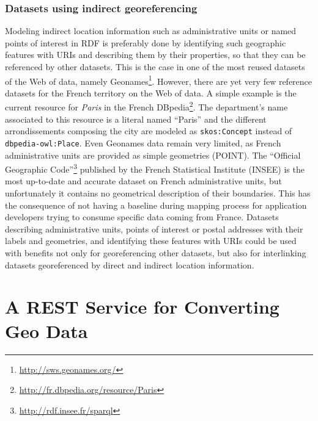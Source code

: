 \subsubsection{Datasets using indirect georeferencing}
Modeling indirect location information such as administrative units or named points of interest in RDF is preferably done by identifying such geographic features with URIs and describing them by their properties, so that they can be referenced by other datasets. This is the case in one of the most reused datasets of the Web of data, namely Geonames\footnote{\url{http://sws.geonames.org/}}. However, there are yet very few reference datasets for the French territory on the Web of data.  A simple example is the current resource for \textit{Paris} in the French DBpedia\footnote{\url{http://fr.dbpedia.org/resource/Paris}}. The department's name associated to this resource is a literal named ``Paris'' and the different arrondissements composing the city are modeled as \texttt{skos:Concept} instead of \texttt{dbpedia-owl:Place}. Even Geonames data remain very limited, as French administrative units are provided as simple geometries (POINT). The ``Official Geographic Code''\footnote{\url{http://rdf.insee.fr/sparql}} published by the French Statistical Institute (INSEE) is the most up-to-date and accurate dataset on French administrative units, but unfortunately it contains no geometrical description of their boundaries. This has the consequence of not having a baseline during mapping process for application developers trying to consume specific data coming from France. Datasets describing administrative units, points of interest or postal addresses with their labels and geometries, and identifying these features with URIs could be used with benefits not only for georeferencing other datasets, but also for interlinking datasets georeferenced by direct and indirect location information.



\section{A REST Service for Converting Geo Data}
\label{sec:rest-service}

